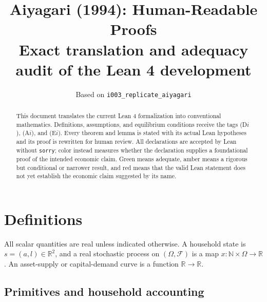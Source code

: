 \documentclass[11pt]{article}
\title{\textbf{Aiyagari (1994): Human-Readable Proofs}\\[0.3em]
  \large Exact translation and adequacy audit of the Lean 4 development}
\author{Based on \texttt{i003\_replicate\_aiyagari}}
\date{}
\newcommand{\R}{\mathbb R}
\newcommand{\N}{\mathbb N}
\begin{document}
\maketitle

\begin{abstract}
This document translates the current Lean 4 formalization into conventional
mathematics.  Definitions, assumptions, and equilibrium conditions receive
the tags (D\(i\)), (A\(i\)), and (E\(i\)).  Every theorem and lemma is stated
with its actual Lean hypotheses and its proof is rewritten for human review.
All declarations are accepted by Lean without \texttt{sorry}; color instead
measures whether the declaration supplies a foundational proof of the intended
economic claim.  Green means adequate, amber means a rigorous but conditional
or narrower result, and red means that the valid Lean statement does not yet
establish the economic claim suggested by its name.
\end{abstract}

\tableofcontents

\section{Definitions}

All scalar quantities are real unless indicated otherwise.  A household state
is \(s=(a,l)\in\R^2\), and a real stochastic process on \((\Omega,\mathcal F)\)
is a map \(x:\N\times\Omega\to\R\).  An asset-supply or capital-demand curve is
a function \(\R\to\R\).

\subsection{Primitives and household accounting}
\end{document}
